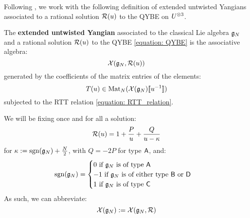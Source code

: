         Following \cite[Definition 2.1]{guay_regelskis_twisted_yangians_for_symmetric_pairs_of_types_BCD}, we work with the following definition of extended untwisted Yangians associated to a rational solution $\mathcal{R}(u)$ to the QYBE on $U^{\tensor 3}$.
        \begin{definition} \label{def: extended_untwisted_yangians}
            The \textbf{extended untwisted Yangian} associated to the classical Lie algebra $\mathfrak{g}_N$ and a rational solution $\mathcal{R}(u)$ to the QYBE \eqref{equation: QYBE} is the associative algebra:
                $$\mathcal{X}(\mathfrak{g}_N, \mathcal{R}(u))$$
            generated by the coefficients of the matrix entries of the elements:
                $$T(u) \in \operatorname{Mat}_N( \mathcal{X}(\mathfrak{g}_N)[\![u^{-1}]\!] )$$
            subjected to the RTT relation \eqref{equation: RTT_relation}.
        \end{definition}

        We will be fixing once and for all a solution:
            $$\mathcal{R}(u) = 1 + \frac{P}{u} + \frac{Q}{u - \kappa}$$
        for $\kappa := \operatorname{sgn}(\mathfrak{g}_N) + \frac{N}{2}$, with $Q = -2P$ for type $\mathsf{A}$, and:
            \begin{equation} \label{equation: BCD_signature}
                \operatorname{sgn}(\mathfrak{g}_N) =
                \begin{cases}
                    \text{$0$ if $\mathfrak{g}_N$ is of type $\mathsf{A}$}
                    \\
                    \text{$-1$ if $\mathfrak{g}_N$ is of either type $\mathsf{B}$ or $\mathsf{D}$}
                    \\
                    \text{$1$ if $\mathfrak{g}_N$ is of type $\mathsf{C}$}
                \end{cases}
            \end{equation}
        As such, we can abbreviate:
            $$\mathcal{X}(\mathfrak{g}_N) := \mathcal{X}(\mathfrak{g}_N, \mathcal{R})$$

